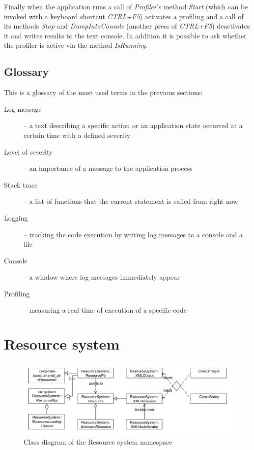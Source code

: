 \documentclass[a4paper, 12pt]{report}
\begin{document}
Finally when the application runs a call of \emph{Profiler}'s method \emph{Start} (which can be invoked with a keyboard shortcut \emph{CTRL+F5}) activates a profiling and a call of its methods \emph{Stop} and \emph{DumpIntoConsole} (another press of \emph{CTRL+F5}) deactivates it and writes results to the text console. In addition it is possible to ask whether the profiler is active via the method \emph{IsRunning}.

\section{Glossary}
This is a glossary of the most used terms in the previous sections:

\begin{description}
  \item[Log message] -- a text describing a specific action or an application state occurred at a certain time with a defined severity
  \item[Level of severity] -- an importance of a message to the application process
  \item[Stack trace] -- a list of functions that the current statement is called from right now
  \item[Logging] -- tracking the code execution by writing log messages to a console and a file
  \item[Console] -- a window where log messages immediately appear
  \item[Profiling] -- measuring a real time of execution of a specific code
\end{description}



\chapter{Resource system}

\begin{figure}[htbp]
	\centering
		\includegraphics[width=1\textwidth]{ResourceSystemClassDiagram.pdf}
	\caption{Class diagram of the Resource system namespace}
	\label{fig:resourcesystem-diagram}
\end{figure}
\end{document}
